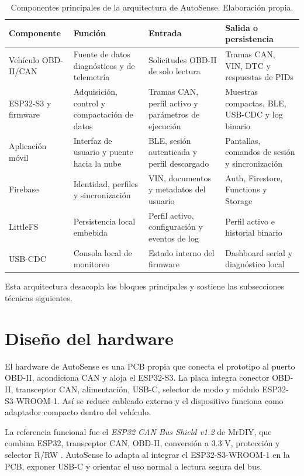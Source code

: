 \documentclass[12pt,letterpaper]{report}
\begin{document}
\begin{table}[!htbp]
\centering
\caption{Componentes principales de la arquitectura de AutoSense. Elaboración propia.}
\label{tab:componentes-arquitectura}
\renewcommand{\arraystretch}{1.08}
\setlength{\tabcolsep}{4pt}
\small
\begin{tabular}{@{}p{}p{}p{}p{}@{}}
\toprule
Componente & Función & Entrada & Salida o persistencia \\
\midrule
Vehículo OBD-II/CAN & Fuente de datos diagnósticos y de telemetría & Solicitudes OBD-II de solo lectura & Tramas CAN, VIN, DTC y respuestas de PIDs \\
ESP32-S3 y firmware & Adquisición, control y compactación de datos & Tramas CAN, perfil activo y parámetros de ejecución & Muestras compactas, BLE, USB-CDC y log binario \\
Aplicación móvil & Interfaz de usuario y puente hacia la nube & BLE, sesión autenticada y perfil descargado & Pantallas, comandos de sesión y sincronización \\
Firebase & Identidad, perfiles y sincronización & VIN, documentos y metadatos del usuario & Auth, Firestore, Functions y Storage \\
LittleFS & Persistencia local embebida & Perfil activo, configuración y eventos de log & Perfil activo e historial binario \\
USB-CDC & Consola local de monitoreo & Estado interno del firmware & Dashboard serial y diagnóstico local \\
\bottomrule
\end{tabular}
\end{table}

Esta arquitectura desacopla los bloques principales y sostiene las subsecciones técnicas siguientes.

\section{Diseño del hardware}

El hardware de AutoSense es una PCB propia que conecta el prototipo al puerto OBD-II, acondiciona CAN y aloja el ESP32-S3. La placa integra conector OBD-II, transceptor CAN, alimentación, USB-C, selector de modo y módulo ESP32-S3-WROOM-1. Así se reduce cableado externo y el dispositivo funciona como adaptador compacto dentro del vehículo.

La referencia funcional fue el \emph{ESP32 CAN Bus Shield v1.2} de MrDIY, que combina ESP32, transceptor CAN, OBD-II, conversión a 3.3 V, protección y selector R/RW \cite{mrdiy2026_esp32_can_shield_v12}. AutoSense lo adapta al integrar el ESP32-S3-WROOM-1 en la PCB, exponer USB-C y orientar el uso normal a lectura segura del bus.
\end{document}
